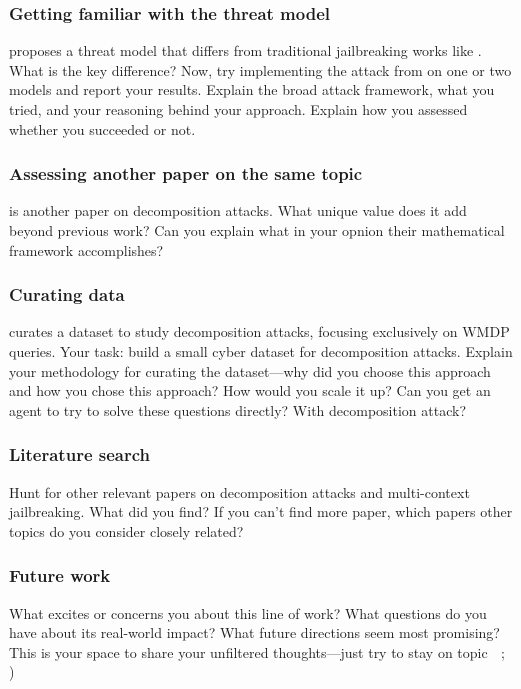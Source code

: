 \documentclass[11pt]{article}
\begin{document}
\subsubsection{Getting familiar with the threat model}
\cite{jones2024adversariesb} proposes a threat model that differs from traditional jailbreaking works like \cite{chao2024jailbreakinga}.
What is the key difference?
Now, try implementing the attack from \cite{jones2024adversariesb} on one or two models and report your results.
Explain the broad attack framework, what you tried, and your reasoning behind your approach. 
Explain how you assessed whether you succeeded or not.

\subsubsection{Assessing another paper on the same topic}
\cite{glukhov2024breach} is another paper on decomposition attacks.
What unique value does it add beyond previous work?
Can you explain what in your opnion their mathematical framework accomplishes?

\subsubsection{Curating data}
\cite{brown2025benchmarking} curates a dataset to study decomposition attacks, focusing exclusively on WMDP queries.
Your task: build a small cyber dataset for decomposition attacks.
Explain your methodology for curating the dataset---why did you choose this approach and how you chose this approach?
How would you scale it up?
Can you get an agent to try to solve these questions directly? With decomposition attack? 

\subsubsection{Literature search}
Hunt for other relevant papers on decomposition attacks and multi-context jailbreaking.
What did you find?
If you can't find more paper, which papers other topics do you consider closely related?

\subsubsection{Future work}
What excites or concerns you about this line of work?
What questions do you have about its real-world impact?
What future directions seem most promising?
This is your space to share your unfiltered thoughts---just try to stay on topic $\;$ ; )
\end{document}
